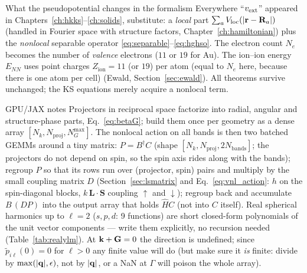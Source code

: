 \begin{keybox}{What the pseudopotential changes in the formalism}
Everywhere ``$v_{\mathrm{ext}}$'' appeared in Chapters~\ref{ch:hkks}--\ref{ch:solids},
substitute: a \emph{local} part $\sum_a V_{\mathrm{loc}}(|\mathbf{r} - \mathbf{R}_a|)$
(handled in Fourier space with structure factors,
Chapter~\ref{ch:hamiltonian}) plus the \emph{nonlocal} separable operator
\eqref{eq:separable}--\eqref{eq:hghso}. The electron count $N_e$ becomes the
number of \emph{valence} electrons ($11$ or $19$ for Au). The ion--ion energy
$E_{NN}$ uses point charges $Z_{\mathrm{ion}} = 11$ (or $19$) per atom
(equal to $N_e$ here, because there is one atom per cell) (Ewald,
Section~\ref{sec:ewald}). All theorems survive unchanged; the KS equations
merely acquire a nonlocal term.
\end{keybox}

\begin{gpubox}{GPU/JAX notes}
Projectors in reciprocal space factorize into radial, angular and
structure-phase parts, Eq.~\eqref{eq:betaG}; build them once per geometry as a dense
array $[N_k, N_{\mathrm{proj}}, N_G^{\max}]$. The nonlocal action on all
bands is then two batched GEMMs around a tiny matrix:
$P = B^{\dagger} C$ (shape $[N_k, N_{\mathrm{proj}}, 2N_{\mathrm{bands}}]$;
the projectors do not depend on spin, so the spin axis rides along with
the bands); regroup $P$ so that its rows run over (projector, spin) pairs
and multiply by the small coupling matrix $D$ (Section~\ref{sec:lsmatrix}
and Eq.~\eqref{eq:vnl_action}: $h$ on the spin-diagonal blocks,
$k\,\mathbf L\cdot\mathbf S$ coupling $\uparrow$ and $\downarrow$); regroup
back and accumulate $B\,(DP)$ into the output array that holds $\hat H C$
(not into $C$ itself). Real spherical harmonics up to
$\ell = 2$ ($s,p,d$: 9 functions) are short closed-form polynomials of the
unit vector components --- write them explicitly, no recursion needed
(Table~\ref{tab:realylm}). At $\mathbf{k}+\mathbf{G} = 0$ the direction is undefined;
since $\tilde p_{i\ell}(0) = 0$ for $\ell > 0$ any finite value will do
(but make sure it \emph{is} finite: divide by $\max(|\mathbf{q}|, \epsilon)$, not
by $|\mathbf{q}|$, or a NaN at $\Gamma$ will poison the whole array).
\end{gpubox}


